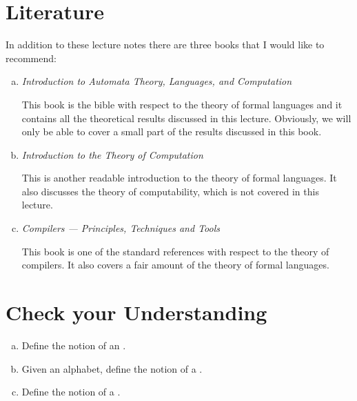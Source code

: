 \section{Literature}
In addition to these lecture notes there are three books that I would like to recommend:
\begin{enumerate}[(a)]
\item \emph{Introduction to Automata Theory, Languages, and Computation}
      \cite{hopcroft:06}

      This book is the bible with respect to the theory of formal languages and it contains all the theoretical
      results discussed in this lecture. 
      Obviously, we will only be able to cover a small part of the results discussed in this book.
\item \emph{Introduction to the Theory of Computation}
      \cite{sipser:2012}

      This is another readable introduction to the theory of formal languages.  It also discusses
      the theory of computability, which is not covered in this lecture.
\item \emph{Compilers --- Principles, Techniques and Tools}
      \cite{aho:2006}

      This book is one of the standard references with respect to the theory of compilers.  It also covers a fair amount of
      the theory of formal languages.
\end{enumerate}

\section{Check your Understanding}
\begin{enumerate}[(a)]
\item Define the notion of an .
\item Given an alphabet, define the notion of a .
\item Define the notion of a .
\end{enumerate}


